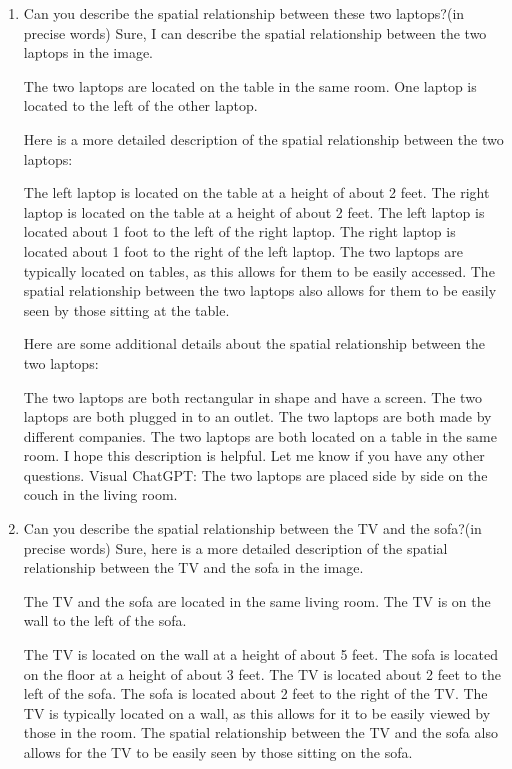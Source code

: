 \begin{enumerate}
    \item Can you describe the spatial relationship between these two laptops?(in precise words)
    \subitem Sure, I can describe the spatial relationship between the two laptops in the image.

    The two laptops are located on the table in the same room. One laptop is located to the left of the other laptop.
    
    Here is a more detailed description of the spatial relationship between the two laptops:
    
    The left laptop is located on the table at a height of about 2 feet.
    The right laptop is located on the table at a height of about 2 feet.
    The left laptop is located about 1 foot to the left of the right laptop.
    The right laptop is located about 1 foot to the right of the left laptop.
    The two laptops are typically located on tables, as this allows for them to be easily accessed. The spatial relationship between the two laptops also allows for them to be easily seen by those sitting at the table.
    
    Here are some additional details about the spatial relationship between the two laptops:
    
    The two laptops are both rectangular in shape and have a screen.
    The two laptops are both plugged in to an outlet.
    The two laptops are both made by different companies.
    The two laptops are both located on a table in the same room.
    I hope this description is helpful. Let me know if you have any other questions.
    \subitem Visual ChatGPT: The two laptops are placed side by side on the couch in the living room.
    \item Can you describe the spatial relationship between the TV and the sofa?(in precise words)
    \subitem 
    Sure, here is a more detailed description of the spatial relationship between the TV and the sofa in the image.
    
    The TV and the sofa are located in the same living room. The TV is on the wall to the left of the sofa.
    
    The TV is located on the wall at a height of about 5 feet.
    The sofa is located on the floor at a height of about 3 feet.
    The TV is located about 2 feet to the left of the sofa.
    The sofa is located about 2 feet to the right of the TV.
    The TV is typically located on a wall, as this allows for it to be easily viewed by those in the room. The spatial relationship between the TV and the sofa also allows for the TV to be easily seen by those sitting on the sofa.
    

\end{enumerate}
